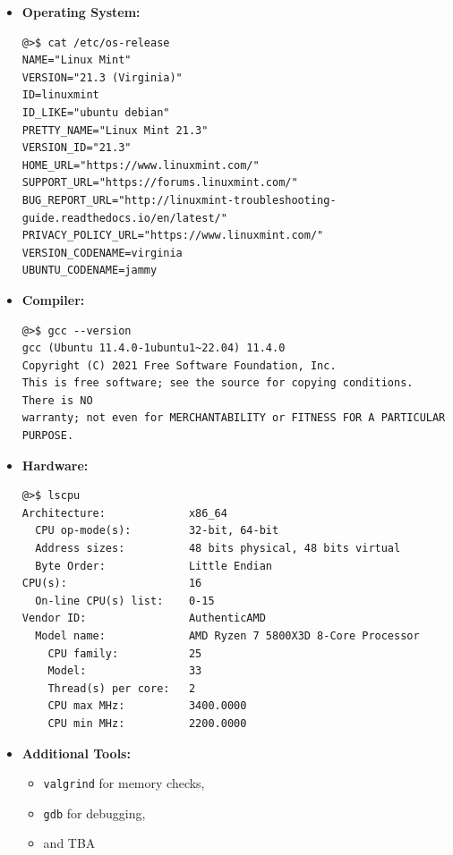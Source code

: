\documentclass[11pt,a4paper]{report}
\theoremstyle{definitionstyle}
\begin{document}
\begin{itemize}
	\item \textbf{Operating System:} 
\begin{verbatim}
@>$ cat /etc/os-release
NAME="Linux Mint"
VERSION="21.3 (Virginia)"
ID=linuxmint
ID_LIKE="ubuntu debian"
PRETTY_NAME="Linux Mint 21.3"
VERSION_ID="21.3"
HOME_URL="https://www.linuxmint.com/"
SUPPORT_URL="https://forums.linuxmint.com/"
BUG_REPORT_URL="http://linuxmint-troubleshooting-guide.readthedocs.io/en/latest/"
PRIVACY_POLICY_URL="https://www.linuxmint.com/"
VERSION_CODENAME=virginia
UBUNTU_CODENAME=jammy

\end{verbatim}
	
	\item \textbf{Compiler:} 
\begin{verbatim}
@>$	gcc --version
gcc (Ubuntu 11.4.0-1ubuntu1~22.04) 11.4.0
Copyright (C) 2021 Free Software Foundation, Inc.
This is free software; see the source for copying conditions.  There is NO
warranty; not even for MERCHANTABILITY or FITNESS FOR A PARTICULAR PURPOSE.
\end{verbatim}
	\item \textbf{Hardware:} 
\begin{verbatim}
@>$ lscpu
Architecture:             x86_64
  CPU op-mode(s):         32-bit, 64-bit
  Address sizes:          48 bits physical, 48 bits virtual
  Byte Order:             Little Endian
CPU(s):                   16
  On-line CPU(s) list:    0-15
Vendor ID:                AuthenticAMD
  Model name:             AMD Ryzen 7 5800X3D 8-Core Processor
    CPU family:           25
    Model:                33
    Thread(s) per core:   2
    CPU max MHz:          3400.0000
    CPU min MHz:          2200.0000

\end{verbatim}
	\item \textbf{Additional Tools:} 
	\begin{itemize}
		\item \texttt{valgrind} for memory checks, 
		\item \texttt{gdb} for debugging, 
		\item and TBA %
	\end{itemize}
\end{itemize}
\end{document}

